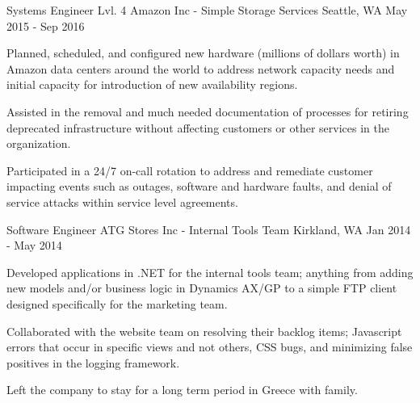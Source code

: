 
    \begin{cventries}
    
    \cventry
    {Systems Engineer Lvl. 4}
    {Amazon Inc - Simple Storage Services}
    {Seattle, WA}
    {May 2015 - Sep 2016}
    {
        \begin{cvitems}
        \item {Planned, scheduled, and configured new hardware (millions of dollars worth) in Amazon data centers around the world to address network capacity needs and initial capacity for introduction of new availability regions.}
        \item {Assisted in the removal and much needed documentation of processes for retiring deprecated infrastructure without affecting customers or other services in the organization.}
        \item {Participated in a 24/7 on-call rotation to address and remediate customer impacting events such as outages, software and hardware faults, and denial of service attacks within service level agreements.}
        \end{cvitems}
    }

    \cventry
    {Software Engineer}
    {ATG Stores Inc - Internal Tools Team}
    {Kirkland, WA}
    {Jan 2014 - May 2014}
    {
        \begin{cvitems}
        \item {Developed applications in .NET for the internal tools team; anything from adding new models and/or business logic in Dynamics AX/GP to a simple FTP client designed specifically for the marketing team.}
        \item {Collaborated with the website team on resolving their backlog items; Javascript errors that occur in specific views and not others, CSS bugs, and minimizing false positives in the logging framework.}
        \item {Left the company to stay for a long term period in Greece with family.}
        \end{cvitems}
    }


\end{cventries}
